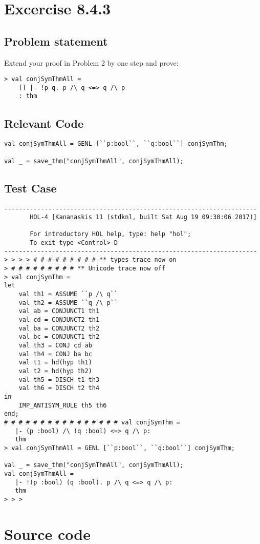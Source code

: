 \documentclass{report}
\begin{document}
\chapter{Excercise 8.4.3}
\label{cha:8.4.3}

\section{Problem statement}
\label{problem-statement-8-4-3}
Extend your proof in Problem 2 by one step and prove:
\begin{lstlisting}[frame=tblr]
> val conjSymThmAll =
	[] |- !p q. p /\ q <=> q /\ p
	: thm
\end{lstlisting}

\section{Relevant Code}
\label{rel-code-8-4-3}
\begin{lstlisting}[frame=TBlr]
val conjSymThmAll = GENL [``p:bool``, ``q:bool``] conjSymThm;

val _ = save_thm("conjSymThmAll", conjSymThmAll);
\end{lstlisting}

\section{Test Case}
\label{trans-8-4-3}
\begin{session}
  \begin{scriptsize}
\begin{verbatim}
---------------------------------------------------------------------
       HOL-4 [Kananaskis 11 (stdknl, built Sat Aug 19 09:30:06 2017)]

       For introductory HOL help, type: help "hol";
       To exit type <Control>-D
---------------------------------------------------------------------
> > > > # # # # # # # # # ** types trace now on
> # # # # # # # # # ** Unicode trace now off
> val conjSymThm =
let
	val th1 = ASSUME ``p /\ q``
	val th2 = ASSUME ``q /\ p``
	val ab = CONJUNCT1 th1
	val cd = CONJUNCT2 th1
	val ba = CONJUNCT2 th2
	val bc = CONJUNCT1 th2
	val th3 = CONJ cd ab
	val th4 = CONJ ba bc
	val t1 = hd(hyp th1)
	val t2 = hd(hyp th2)
	val th5 = DISCH t1 th3
	val th6 = DISCH t2 th4
in
	IMP_ANTISYM_RULE th5 th6
end;
# # # # # # # # # # # # # # # # val conjSymThm =
   |- (p :bool) /\ (q :bool) <=> q /\ p:
   thm
> val conjSymThmAll = GENL [``p:bool``, ``q:bool``] conjSymThm;

val _ = save_thm("conjSymThmAll", conjSymThmAll);
val conjSymThmAll =
   |- !(p :bool) (q :bool). p /\ q <=> q /\ p:
   thm
> > > 
\end{verbatim}
  \end{scriptsize}
\end{session}


\appendix{}

\chapter{Source code}
\label{cha:source-code}

\end{document}
